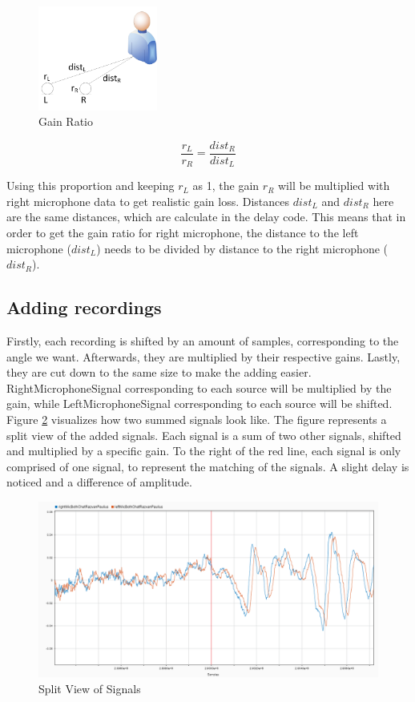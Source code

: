 \begin{figure}[htp]
	\centering
	\includegraphics[width=0.35\textwidth]{Illustrations/gainRatio.jpg}
	\caption{Gain Ratio}
	\label{fig:ratioDependence}
\end{figure}
\begin{equation}
	\frac{r_L}{r_R} = \frac{dist_R}{dist_L}
\end{equation}
 
Using this proportion and keeping \(r_L\) as 1, the gain \(r_R\) will be multiplied 
with right microphone data to get realistic gain loss. Distances \(dist_L\) and 
\(dist_R\) here are the same distances, which are calculate in the delay code. This 
means that in order to get the gain ratio for right microphone, the distance to the 
left microphone (\(dist_L\)) needs to be divided by distance to the right 
microphone (\(dist_R\)).
\newpage
\subsection*{Adding recordings}
Firstly, each recording is shifted by an amount of samples, corresponding to the 
angle we want. Afterwards, they are multiplied by their respective gains. Lastly, 
they are cut down to the same size to make the adding easier. RightMicrophoneSignal 
corresponding to each source will be multiplied by the gain, while LeftMicrophoneSignal  
corresponding to each source will be shifted. Figure \ref{fig:SplitTwoSources} 
visualizes how two summed signals look like. The figure represents a split view of
the added signals. Each signal is a sum of two other signals, shifted and multiplied
by a specific gain. To the right of the red line, each signal is only comprised of
one signal, to represent the matching of the signals. A slight delay is noticed
and a difference of amplitude. 

\begin{figure}[htp]
	\centering
	\includegraphics[width=.9\textwidth]{Illustrations/twoSourcesAndJustOneLater.png}
	\caption{Split View of Signals}
	\label{fig:SplitTwoSources}
\end{figure}

